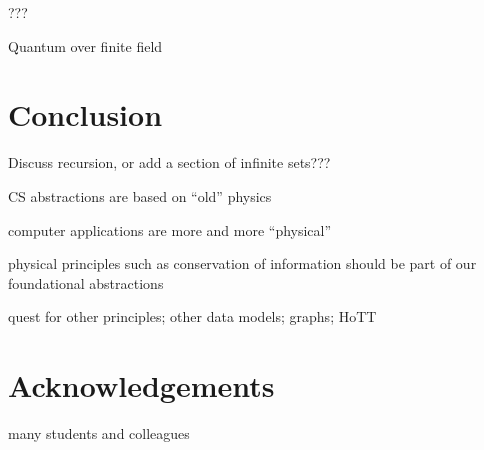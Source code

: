 \documentclass{article}
\begin{document}
???

Quantum over finite field 

\section{Conclusion}

Discuss recursion, or add a section of infinite sets???

CS abstractions are based on ``old'' physics

computer applications are more and more ``physical''

physical principles such as conservation of information should be part
of our foundational abstractions

quest for other principles; other data models; graphs; HoTT

\section*{Acknowledgements} many students and colleagues 



\end{document}
